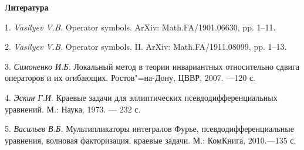 \smallskip \centerline {\bf Литература} \nopagebreak

1. {\it Vasilyev V.B.} Operator symbols. ArXiv: Math.FA/1901.06630, pp. 1--11.

2. {\it Vasilyev V.B.} Operator symbols. II. ArXiv: Math.FA/1911.08099, pp. 1--13.

3. {\it Симоненко И.Б.} Локальный метод в теории инвариантных относительно сдвига операторов и их огибающих. Ростов"=на-Дону, ЦВВР, 2007. ---120 с.

4. {\it Эскин Г.И.} Краевые задачи для эллиптических псевдодифференциальных уравнений. М.: Наука, 1973. — 232 с.

5. {\it Васильев В.Б.} Мультипликаторы интегралов Фурье, псевдодифференциальные уравнения, волновая факторизация, краевые задачи. М.: КомКнига, 2010.---135 с.
